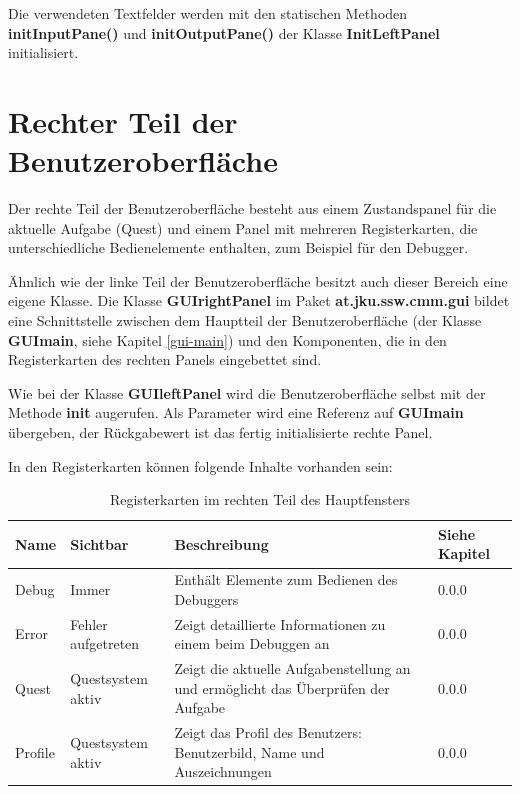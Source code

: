 Die verwendeten Textfelder werden mit den statischen Methoden \textbf{initInputPane()} und \textbf{initOutputPane()} der Klasse \textbf{InitLeftPanel} initialisiert.

\section{Rechter Teil der Benutzeroberfläche}
Der rechte Teil der Benutzeroberfläche besteht aus einem Zustandspanel für die aktuelle Aufgabe (Quest) und einem Panel mit mehreren Registerkarten, die unterschiedliche Bedienelemente enthalten, zum Beispiel für den Debugger.

Ähnlich wie der linke Teil der Benutzeroberfläche besitzt auch dieser Bereich eine eigene Klasse. Die Klasse \textbf{GUIrightPanel} im Paket \textbf{at.jku.ssw.cmm.gui} bildet eine Schnittstelle zwischen dem Hauptteil der Benutzeroberfläche (der Klasse \textbf{GUImain}, siehe Kapitel \ref{gui-main}) und den Komponenten, die in den Registerkarten des rechten Panels eingebettet sind.

Wie bei der Klasse \textbf{GUIleftPanel} wird die Benutzeroberfläche selbst mit der Methode \textbf{init} augerufen. Als Parameter wird eine Referenz auf \textbf{GUImain} übergeben, der Rückgabewert ist das fertig initialisierte rechte Panel.

In den Registerkarten können folgende Inhalte vorhanden sein:
\def\arraystretch{1.6}
\begin{table}
\begin{tabularx}{\columnwidth}{l|p{3cm}|p{6cm}|l}
\textbf{Name}&\textbf{Sichtbar}&\textbf{Beschreibung}&\textbf{Siehe Kapitel}\\
\hline
Debug&Immer&Enthält Elemente zum Bedienen des Debuggers&0.0.0\\%
Error&Fehler aufgetreten&Zeigt detaillierte Informationen zu einem beim Debuggen an&0.0.0\\%
Quest&Questsystem aktiv&Zeigt die aktuelle Aufgabenstellung an und ermöglicht das Überprüfen der Aufgabe&0.0.0\\%
Profile&Questsystem aktiv&Zeigt das Profil des Benutzers: Benutzerbild, Name und Auszeichnungen&0.0.0%
\end{tabularx}
\caption{Registerkarten im rechten Teil des Hauptfensters}\label{tab:gui-main-right-reg}
\end{table}

